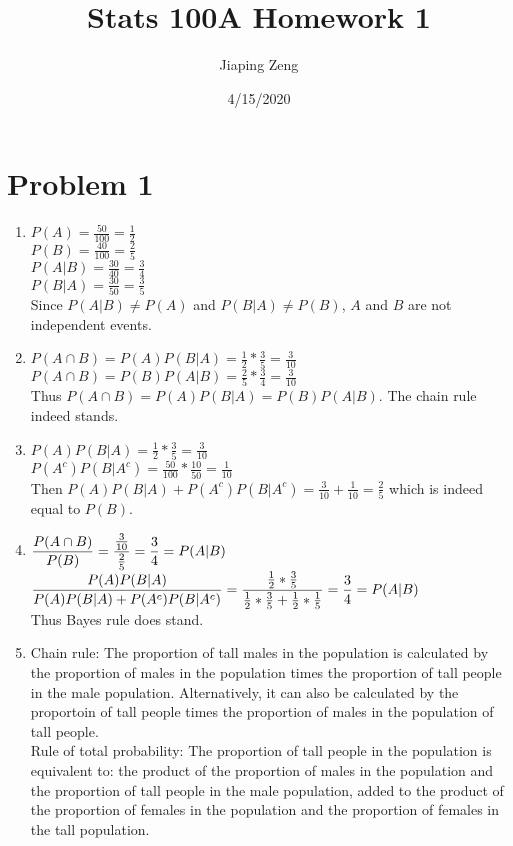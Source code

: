 \documentclass{article}
\title{Stats 100A Homework 1}
\author{Jiaping Zeng}
\date{4/15/2020}
\begin{document}
\maketitle

\section*{Problem 1}
\begin{enumerate}
    \item
          $P(A)=\frac{50}{100}=\frac{1}{2}$\\
          $P(B)=\frac{40}{100}=\frac{2}{5}$\\
          $P(A|B)=\frac{30}{40}=\frac{3}{4}$\\
          $P(B|A)=\frac{30}{50}=\frac{3}{5}$\\
          Since $P(A|B)\neq P(A)$ and $P(B|A)\neq P(B)$, $A$ and $B$ are not independent events.
    \item
          $P(A\cap B)=P(A)P(B|A)=\frac{1}{2}*\frac{3}{5}=\frac{3}{10}$\\
          $P(A\cap B)=P(B)P(A|B)=\frac{2}{5}*\frac{3}{4}=\frac{3}{10}$\\
          Thus $P(A\cap B)=P(A)P(B|A)=P(B)P(A|B)$. The chain rule indeed stands.
    \item
          $P(A)P(B|A)=\frac{1}{2}*\frac{3}{5}=\frac{3}{10}$\\
          $P(A^c)P(B|A^c)=\frac{50}{100}*\frac{10}{50}=\frac{1}{10}$\\
          Then $P(A)P(B|A)+P(A^c)P(B|A^c)=\frac{3}{10}+\frac{1}{10}=\frac{2}{5}$ which is indeed equal to $P(B)$.
    \item
          $\mathlarger{\frac{P(A\cap B)}{P(B)}=\frac{\frac{3}{10}}{\frac{2}{5}}=\frac{3}{4}=P(A|B)}$\\
          $\mathlarger{\frac{P(A)P(B|A)}{P(A)P(B|A)+P(A^c)P(B|A^c)}=\frac{\frac{1}{2}*\frac{3}{5}}{\frac{1}{2}*\frac{3}{5}+\frac{1}{2}*\frac{1}{5}}=\frac{3}{4}=P(A|B)}$\\
          Thus Bayes rule does stand.
    \item
          Chain rule: The proportion of tall males in the population is calculated by the proportion of males in the population times the proportion of tall people in the male population. Alternatively, it can also be calculated by the proportoin of tall people times the proportion of males in the population of tall people.\\
          Rule of total probability: The proportion of tall people in the population is equivalent to: the product of the proportion of males in the population and the proportion of tall people in the male population, added to the product of the proportion of females in the population and the proportion of females in the tall population.\\

\end{enumerate}
\end{document}
